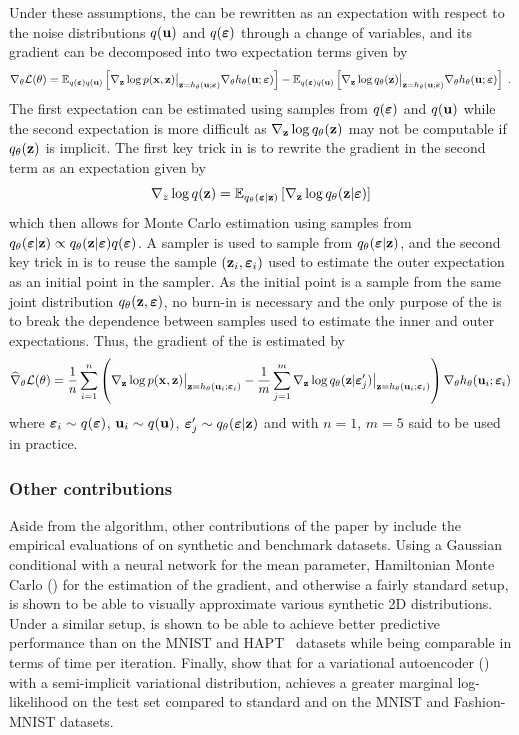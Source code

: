 \documentclass[10pt]{article}
\begin{document}
Under these assumptions, the \elbo can be rewritten as an expectation with respect to the noise distributions $q(\mathbf{u})$ and $q(\bm{\varepsilon})$ through a change of variables, and its gradient can be decomposed into two expectation terms given by
\[
\nabla_\theta \mathcal{L}(\theta) = \mathbb{E}_{q(\bm{\varepsilon})q(\mathbf{u})}\left[\nabla_{\mathbf{z}} \log p(\mathbf{x},\mathbf{z})\big|_{\mathbf{z}=h_\theta(\mathbf{u};\bm{\varepsilon})}\nabla_\theta h_\theta(\mathbf{u};\bm{\varepsilon})\right] - \mathbb{E}_{q(\bm{\varepsilon})q(\mathbf{u})}\left[\nabla_{\mathbf{z}} \log q_\theta(\mathbf{z})\big|_{\mathbf{z}=h_\theta(\mathbf{u};\bm{\varepsilon})}\nabla_\theta h_\theta(\mathbf{u};\bm{\varepsilon})\right] \;.
\]
The first expectation can be estimated using samples from $q(\bm{\varepsilon})$ and $q(\mathbf{u})$ while the second expectation is more difficult as $\nabla_{\mathbf{z}}\log q_\theta(\mathbf{z})$ may not be computable if $q_\theta(\mathbf{z})$ is implicit. The first key trick in \uivi is to rewrite the gradient in the second term as an expectation given by
\[
\nabla_z\log q(\mathbf{z}) = \mathbb{E}_{q_\theta(\bm{\varepsilon}|\mathbf{z})}\left[\nabla_{\mathbf{z}}\log q_\theta(\mathbf{z}|\bm{\varepsilon})\right]
\]
which then allows for Monte Carlo estimation using samples from $q_\theta(\bm{\varepsilon}|\mathbf{z})\propto q_\theta(\mathbf{z}|\bm{\varepsilon})q(\bm{\varepsilon})$. A \mcmc sampler is used to sample from $q_\theta(\bm{\varepsilon}|\mathbf{z})$, and the second key trick in \uivi is to reuse the sample $(\mathbf{z}_i,\bm{\varepsilon}_i)$ used to estimate the outer expectation as an initial point in the \mcmc sampler. As the initial point is a sample from the same joint distribution $q_\theta(\mathbf{z},\bm{\varepsilon})$, no burn-in is necessary and the only purpose of the \mcmc is to break the dependence between samples used to estimate the inner and outer expectations. Thus, the gradient of the \elbo is estimated by
\[
\widehat{\nabla}_\theta\mathcal{L}(\theta) = \frac{1}{n}\sum_{i=1}^n \left(\nabla_{\mathbf{z}}\log p(\mathbf{x},\mathbf{z})\big|_{\mathbf{z}=h_\theta(\mathbf{u}_i;\bm{\varepsilon}_i)} - \frac{1}{m}\sum_{j=1}^m \nabla_{\mathbf{z}}\log q_\theta(\mathbf{z}|\bm{\varepsilon}_j')\big|_{\mathbf{z}=h_\theta(\mathbf{u}_i;\bm{\varepsilon}_i)} \right)\nabla_\theta h_\theta(\mathbf{u}_i;\bm{\varepsilon}_i)
\]
where $\bm{\varepsilon}_i\sim q(\bm{\varepsilon})$, $\mathbf{u}_i\sim q(\mathbf{u})$, $\bm{\varepsilon}_j'\sim q_\theta(\bm{\varepsilon}|\mathbf{z})$ and with $n=1$, $m=5$ said to be used in practice.

\subsubsection{Other contributions}

Aside from the \uivi algorithm, other contributions of the paper by \citet{Titsias:2019} include the empirical evaluations of \uivi on synthetic and benchmark datasets. Using a Gaussian conditional with a neural network for the mean parameter, Hamiltonian Monte Carlo (\hmc) for the \mcmc estimation of the \elbo gradient, and otherwise a fairly standard setup, \uivi is shown to be able to visually approximate various synthetic 2D distributions. Under a similar setup, \uivi is shown to be able to achieve better predictive performance than \sivi on the MNIST and HAPT~\citep{Reyes:2014} datasets while being comparable in terms of time per iteration. Finally, \citet{Titsias:2019} show that for a variational autoencoder (\vae)~\citep{Kingma:2013} with a semi-implicit variational distribution, \uivi achieves a greater marginal log-likelihood on the test set compared to standard \vae and \sivi on the MNIST and Fashion-MNIST datasets.
\end{document}
